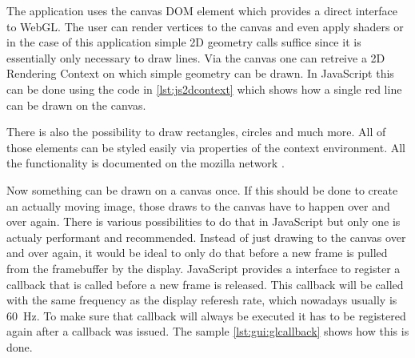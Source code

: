 The application uses the canvas DOM  element which provides a direct interface
to WebGL. The user can render vertices to the canvas and even apply shaders or
in the case of  this application simple 2D geometry calls  suffice since it is
essentially only necessary to draw lines.
Via  the canvas  one  can retreive  a  2D Rendering  Context  on which  simple
geometry can be drawn.
In JavaScript this  can be done using the code  in \ref{lst:js2dcontext} which
shows how a single red line can be drawn on the canvas.


There is also  the possibility to draw rectangles, circles  and much more. All
of  those  elements  can  be  styled easily  via  properties  of  the  context
environment. All  the  functionality  is  documented on  the  mozilla  network
\cite{moz:2dcontext}.

Now something can be drawn on a  canvas once. If this should be done to create
an actually moving  image, those draws to  the canvas have to  happen over and
over again. There is  various possibilities to do that in  JavaScript but only
one  is actualy  performant and  recommended. Instead of  just drawing  to the
canvas over  and over again, it  would be ideal to  only do that before  a new
frame is  pulled from  the framebuffer by  the display. JavaScript  provides a
interface  to  register a  callback  that  is called  before  a  new frame  is
released. This callback will be called with  the same frequency as the display
referesh rate, which nowadays usually is \SI{60}{\hertz}.
To make  sure that callback  will always be executed  it has to  be registered
again after  a callback was issued. The  sample \ref{lst:gui:glcallback} shows
how this is done.


